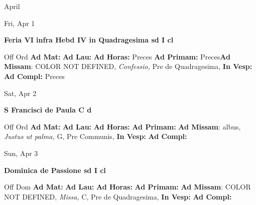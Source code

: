 \documentclass[10pt]{memoir}
\begin{document}
\begin{center}
\pagebreak
\thispagestyle{empty}
{\Huge April}
\end{center}
                    
\begin{center}
\begin{minipage}{3.5in}
\vspace{2em}
\begin{center}Fri, Apr 1
\end{center}
\textbf{ \large Feria VI infra Hebd IV in Quadragesima 
\textnormal{\normalsize sd I cl}}

\begin{justify}Off Ord
\textbf{Ad Mat: }
\textbf{Ad Lau: }
\textbf{Ad Horas: }Preces
\textbf{Ad Primam: }Preces\textbf{Ad Missam}: COLOR NOT DEFINED, \textit{Confessio,} Pre de Quadragesima, 
\textbf{In Vesp: }
\textbf{Ad Compl: }Preces
\end{justify}
\end{minipage}
\end{center}

\begin{center}
\begin{minipage}{3.5in}
\vspace{2em}
\begin{center}Sat, Apr 2
\end{center}
\textbf{ \large S Francisci de Paula C
\textnormal{\normalsize d}}

\begin{justify}Off Ord
\textbf{Ad Mat: }
\textbf{Ad Lau: }
\textbf{Ad Horas: }
\textbf{Ad Primam: }\textbf{Ad Missam}: albus, \textit{Justus ut palma,} G, Pre Communis, 
\textbf{In Vesp: }
\textbf{Ad Compl: }
\end{justify}
\end{minipage}
\end{center}

\begin{center}
\begin{minipage}{3.5in}
\vspace{2em}
\begin{center}Sun, Apr 3
\end{center}
\textbf{ \large Dominica de Passione
\textnormal{\normalsize sd I cl}}

\begin{justify}Off Dom
\textbf{Ad Mat: }
\textbf{Ad Lau: }
\textbf{Ad Horas: }
\textbf{Ad Primam: }\textbf{Ad Missam}: COLOR NOT DEFINED, \textit{Missa,} C, Pre de Quadragesima, 
\textbf{In Vesp: }
\textbf{Ad Compl: }
\end{justify}
\end{minipage}
\end{center}
\end{document}
